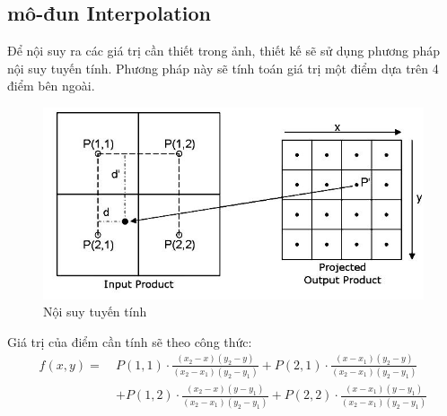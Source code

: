 \subsection{mô-đun Interpolation}
Để nội suy ra các giá trị cần thiết trong ảnh, thiết kế sẽ sử dụng phương pháp nội suy tuyến tính. Phương pháp này sẽ tính toán giá trị một điểm dựa trên 4 điểm bên ngoài. 
\begin{figure}[!ht]
	\centering
	\includegraphics[width=1\linewidth]{figures/BilinearInterpolation_fig001.png.jpg}
	\caption{Nội suy tuyến tính}
	\label{fig:BilinearInterpolationV2}
\end{figure}


Giá trị của điểm cần tính sẽ theo công thức:
\begin{equation}
	\begin{aligned}
		f(x, y) =\ &P(1,1) \cdot \frac{(x_2 - x)(y_2 - y)}{(x_2 - x_1)(y_2 - y_1)} + P(2,1) \cdot \frac{(x - x_1)(y_2 - y)}{(x_2 - x_1)(y_2 - y_1)} \\
		&+ P(1,2) \cdot \frac{(x_2 - x)(y - y_1)}{(x_2 - x_1)(y_2 - y_1)} + P(2,2) \cdot \frac{(x - x_1)(y - y_1)}{(x_2 - x_1)(y_2 - y_1)}
	\end{aligned}
\end{equation}

